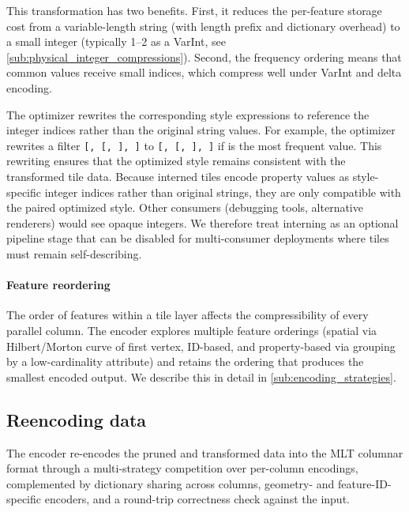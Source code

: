 {This transformation has two benefits.
First, it reduces the per-feature storage cost from a variable-length string (with length prefix and dictionary overhead) to a small integer (typically \qtyrange{1}{2}{\byte} as a \ac{VarInt}, see \cref{sub:physical_integer_compressions}).
Second, the frequency ordering means that common values receive small indices, which compress well under \ac{VarInt} and delta encoding.

The optimizer rewrites the corresponding style expressions to reference the integer indices rather than the original string values.
For example, the optimizer rewrites a filter \texttt{[, [, ], ]} to \texttt{[, [, ], ]} if \texttt{} is the most frequent value.
This rewriting ensures that the optimized style remains consistent with the transformed tile data.
Because interned tiles encode property values as style-specific integer indices rather than original strings, they are only compatible with the paired optimized style.
Other consumers (debugging tools, alternative renderers) would see opaque integers.
We therefore treat interning as an optional pipeline stage that can be disabled for multi-consumer deployments where tiles must remain self-describing.

\paragraph{Feature reordering}\label{sub:feature_reordering}
The order of features within a tile layer affects the compressibility of every parallel column.
The encoder explores multiple feature orderings (spatial via Hilbert/Morton curve of first vertex, ID-based, and property-based via grouping by a low-cardinality attribute) and retains the ordering that produces the smallest encoded output.
We describe this in detail in \cref{sub:encoding_strategies}.

\subsection{Reencoding data}

The encoder re-encodes the pruned and transformed data into the \ac{MLT} columnar format through a multi-strategy competition over per-column encodings, complemented by dictionary sharing across columns, geometry- and feature-ID-specific encoders, and a round-trip correctness check against the input.

}
